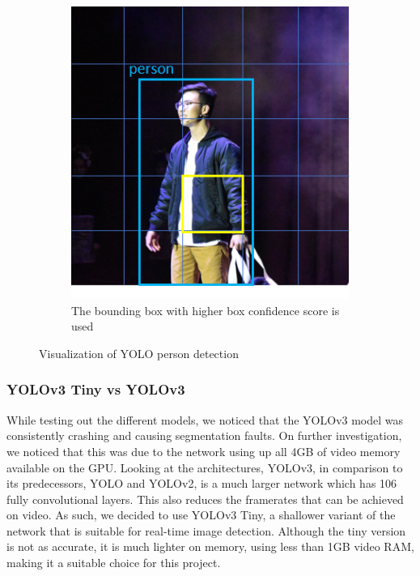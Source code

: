 \begin{figure}[ht]
\begin{subfigure}[b]{.45\textwidth}
		\includegraphics[width=1.0\linewidth]{img/chapter5_implementation/yoloAlgo.png}
		\caption{The bounding box with higher box confidence score is used}
	\end{subfigure}
	\vspace{-1\baselineskip}
	\begin{center}
		\caption{Visualization of YOLO person detection}
		\label{fig:yoloViz}
	\end{center}
	\vspace{-2\baselineskip}
\end{figure}


\subsubsection{YOLOv3 Tiny vs YOLOv3}
While testing out the different models, we noticed that the YOLOv3 model was consistently crashing and causing segmentation faults. On further investigation, we noticed that this was due to the network using up all 4GB of video memory available on the GPU. Looking at the architectures, YOLOv3, in comparison to its predecessors, YOLO and YOLOv2, is a much larger network which has 106 fully convolutional layers. This also reduces the framerates that can be achieved on video. As such, we decided to use YOLOv3 Tiny, a shallower variant of the network that is suitable for real-time image detection. Although the tiny version is not as accurate, it is much lighter on memory, using less than 1GB video RAM, making it a suitable choice for this project.

